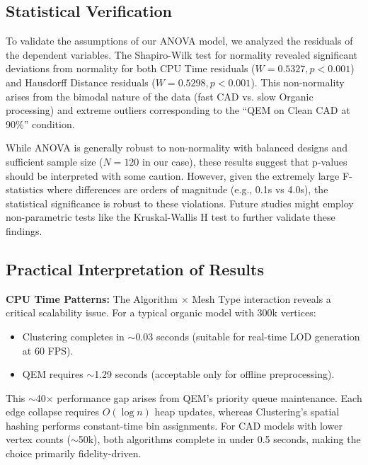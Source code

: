 \subsection{Statistical Verification}
To validate the assumptions of our ANOVA model, we analyzed the residuals of the dependent variables. The Shapiro-Wilk test for normality revealed significant deviations from normality for both CPU Time residuals ($W=0.5327, p < 0.001$) and Hausdorff Distance residuals ($W=0.5298, p < 0.001$). This non-normality arises from the bimodal nature of the data (fast CAD vs. slow Organic processing) and extreme outliers corresponding to the ``QEM on Clean CAD at 90\%'' condition.

While ANOVA is generally robust to non-normality with balanced designs and sufficient sample size ($N=120$ in our case), these results suggest that p-values should be interpreted with some caution. However, given the extremely large F-statistics where differences are orders of magnitude (e.g., 0.1s vs 4.0s), the statistical significance is robust to these violations. Future studies might employ non-parametric tests like the Kruskal-Wallis H test to further validate these findings.

\subsection{Practical Interpretation of Results}

\textbf{CPU Time Patterns:}
The Algorithm $\times$ Mesh Type interaction reveals a critical scalability issue. For a typical organic model with 300k vertices:
\begin{itemize}
    \item Clustering completes in $\sim$0.03 seconds (suitable for real-time LOD generation at 60 FPS).
    \item QEM requires $\sim$1.29 seconds (acceptable only for offline preprocessing).
\end{itemize}
This $\sim$40$\times$ performance gap arises from QEM's priority queue maintenance. Each edge collapse requires $O(\log n)$ heap updates, whereas Clustering's spatial hashing performs constant-time bin assignments. For CAD models with lower vertex counts ($\sim$50k), both algorithms complete in under 0.5 seconds, making the choice primarily fidelity-driven.

